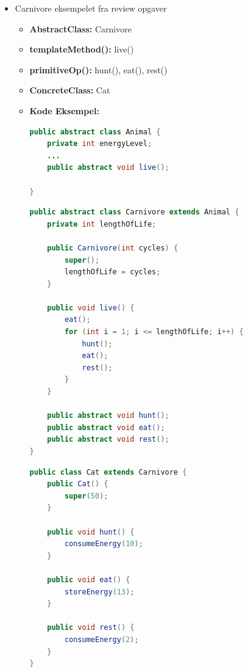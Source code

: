 \documentclass{article}
\begin{document}
\begin{itemize}
\begin{itemize}
			\item Carnivore eksempelet fra review opgaver
			\begin{itemize}
				\item \textbf{AbstractClass:} Carnivore
				\item \textbf{templateMethod():} live()
				\item \textbf{primitiveOp():} hunt(), eat(), rest()
				\item \textbf{ConcreteClass:} Cat 
				\item \textbf{Kode Eksempel:}
\begin{lstlisting}[language=java]
public abstract class Animal {
	private int energyLevel;
	...
	public abstract void live();

}    

\end{lstlisting}

\begin{lstlisting}[language=java]
public abstract class Carnivore extends Animal {
	private int lengthOfLife;

	public Carnivore(int cycles) {
		super();
		lengthOfLife = cycles;
	}
	
	public void live() {
		eat();
		for (int i = 1; i <= lengthOfLife; i++) {
			hunt();
			eat();
			rest();
		}
	}
	
	public abstract void hunt();
	public abstract void eat();
	public abstract void rest();
}
\end{lstlisting}

\begin{lstlisting}[language=java]
public class Cat extends Carnivore {
	public Cat() {
		super(50);
	}
	
	public void hunt() {
		consumeEnergy(10);
	}
	
	public void eat() {
		storeEnergy(13);
	}
	
	public void rest() {
		consumeEnergy(2);
	}
}
\end{lstlisting}					
			\end{itemize}
		\end{itemize}
	\end{itemize}
\end{document}

